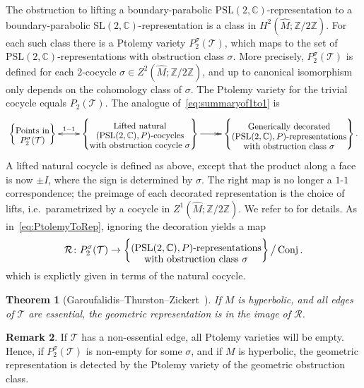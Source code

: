 \documentclass[12pt]{amsart}
\newtheorem{theorem}{Theorem}[section]
\theoremstyle{definition}
\newtheorem{remark}[theorem]{Remark}
\numberwithin{equation}{section}
\def\SL{\mathrm{SL}}
\def\PSL{\mathrm{PSL}}
\DeclareMathOperator{\Conj}{Conj}
\def\Z{\mathbb{Z}}
\def\C{\mathbb{C}}
\def\T{\mathcal{T}}
\begin{document}
The obstruction to lifting a boundary-parabolic $\PSL(2,\C)$-representation to a boundary-parabolic $\SL(2,\C)$-representation is a class in $H^2(\widehat M;\Z/2\Z)$. For each such class there is a Ptolemy variety $P^\sigma_2(\T)$, which maps to the set of $\PSL(2,\C)$-representations with obstruction class $\sigma$. More precisely, $P^\sigma_2(\T)$ is defined for each $2$-cocycle $\sigma\in Z^2(\widehat M;\Z/2\Z)$, and up to canonical isomorphism only depends on the cohomology class of $\sigma$. The Ptolemy variety for the trivial cocycle equals $P_2(\T)$. The analogue of~\eqref{eq:summaryof1to1} is
\begin{equation}\label{eq:1to1Obstruction}
\xymatrix{\left\{\txt{Points in\\$P^{\sigma}_2(\T)$}\right\}\ar@{<->}[r]^-{1-1}&\left\{\txt{Lifted natural\\$(\PSL(2,\C),P)$-cocycles\\with obstruction cocycle $\sigma$}\right\}\ar@{->>}[r]&\left\{\txt{Generically decorated\\
$(\PSL(2,\C),P)$-representations\\with obstruction class $\sigma$}\right\}.}
\end{equation}
A lifted natural cocycle is defined as above, except that the product along a face is now $\pm I$, where the sign is determined by $\sigma$. The right map is no longer a $1$-$1$ correspondence; the preimage of each decorated representation is the choice of lifts, i.e.~parametrized by a cocycle in $Z^1(\widehat M;\Z/2\Z)$. We refer to \cite{GaroufalidisThurstonZickert} for details. As in~\eqref{eq:PtolemyToRep}, ignoring the decoration yields a map
\begin{equation}\label{eq:PtolemyToRepObstruction}
\mathcal R\colon P_2^{\sigma}(\T)\to \left\{\txt{$(\PSL(2,\C),P)$-representations\\with obstruction class $\sigma$}\right\}
\big/\Conj.
\end{equation}
which is explictly given in terms of the natural cocycle.
\begin{theorem}[Garoufalidis--Thurston--Zickert~\cite{GaroufalidisThurstonZickert}]\label{thm:EssentialEdges}
If $M$ is hyperbolic, and all edges of $\T$ are essential, the geometric representation is in the image of $\mathcal R$.
\end{theorem}
\begin{remark}
If $\T$ has a non-essential edge, all Ptolemy varieties will be empty. Hence, if $P^\sigma_2(\T)$ is non-empty for some $\sigma$, and if $M$ is hyperbolic, the geometric representation is detected by the Ptolemy variety of the geometric obstruction class.
\end{remark}
\end{document}
